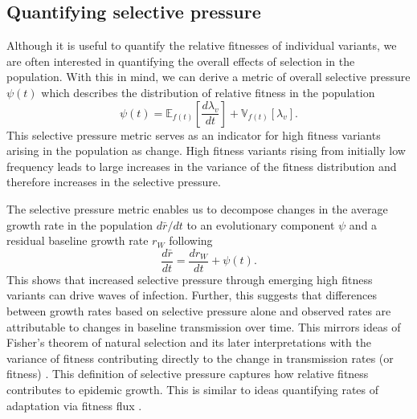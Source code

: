 \documentclass[11pt,oneside,letterpaper]{article}
\newcommand{\Expect}{\mathbb{E}}
\newcommand{\Var}{\mathbb{V}}
\newcommand{\wt}{W}
\begin{document}

\subsection*{Quantifying selective pressure}

Although it is useful to quantify the relative fitnesses of individual variants, we are often interested in quantifying the overall effects of selection in the population.
With this in mind, we can derive a metric of overall selective pressure $\psi(t)$ which describes the distribution of relative fitness in the population
\begin{equation}
\psi(t) =  \Expect_{f(t)}\left[ \frac{d \lambda_v}{d t}\right] +  \Var_{f(t)}[\lambda_{v}].
\end{equation}
This selective pressure metric serves as an indicator for high fitness variants arising in the population as change.
High fitness variants rising from initially low frequency leads to large increases in the variance of the fitness distribution and therefore increases in the selective pressure.

The selective pressure metric enables us to decompose changes in the average growth rate in the population $d\bar{r}/dt$ to an evolutionary component $\psi$ and a residual baseline growth rate $r_\wt$ following
\begin{equation}
    \frac{d\bar{r}}{dt} = \frac{dr_{\wt}}{dt} + \psi(t).
\end{equation}
This shows that increased selective pressure through emerging high fitness variants can drive waves of infection.
Further, this suggests that differences between growth rates based on selective pressure alone and observed rates are attributable to changes in baseline transmission over time.
This mirrors ideas of Fisher's theorem of natural selection and its later interpretations with the variance of fitness contributing directly to the change in transmission rates (or fitness) \cite{Ewens1989, Ewens2024}.
This definition of selective pressure captures how relative fitness contributes to epidemic growth.
This is similar to ideas quantifying rates of adaptation via fitness flux \cite{Mustonen2010}.
\end{document}
